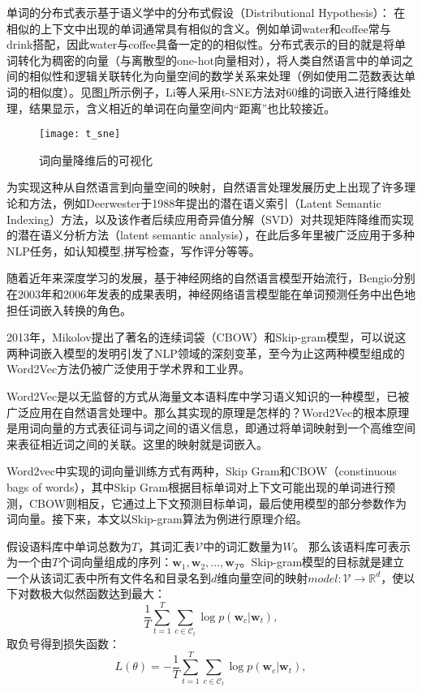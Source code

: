 单词的分布式表示基于语义学中的分布式假设（Distributional Hypothesis）\cite{distributional_hypothesis}：
在相似的上下文中出现的单词通常具有相似的含义。例如单词water和coffee常与drink搭配，因此water与coffee具备一定的的相似性。分布式表示的目的就是将单词转化为稠密的向量（与离散型的one-hot向量相对），将人类自然语言中的单词之间的相似性和逻辑关联转化为向量空间的数学关系来处理（例如使用二范数表达单词的相似度）。见图\ref{fig:t_sne}所示例子，Li等人\cite{visualizing}采用t-SNE方法对60维的词嵌入进行降维处理，结果显示，含义相近的单词在向量空间内“距离”也比较接近。
\begin{figure}[htp]
\centering
\texttt{[image: t\_sne]}
\caption{词向量降维后的可视化}
\label{fig:t_sne}
\end{figure}


为实现这种从自然语言到向量空间的映射，自然语言处理发展历史上出现了许多理论和方法，例如Deerwester于1988年提出的潜在语义索引（Latent Semantic Indexing）方法\cite{LSI}，以及该作者后续应用奇异值分解（SVD）对共现矩阵降维而实现的潜在语义分析方法（latent semantic analysis）\cite{LSA}，在此后多年里被广泛应用于多种NLP任务，如认知模型\cite{cognitive_model},拼写检查\cite{spell_checking}，写作评分\cite{essay_grading}等等。

随着近年来深度学习的发展，基于神经网络的自然语言模型开始流行，Bengio分别在2003年\cite{bengio2003}和2006年\cite{bengio2006}发表的成果表明，神经网络语言模型能在单词预测任务中出色地担任词嵌入转换的角色。

2013年，Mikolov提出了著名的连续词袋（CBOW）和Skip-gram模型\cite{skipgram}，可以说这两种词嵌入模型的发明引发了NLP领域的深刻变革，至今为止这两种模型组成的Word2Vec方法仍被广泛使用于学术界和工业界。

Word2Vec是以无监督的方式从海量文本语料库中学习语义知识的一种模型，已被广泛应用在自然语言处理中。那么其实现的原理是怎样的？Word2Vec的根本原理是用词向量的方式表征词与词之间的语义信息，即通过将单词映射到一个高维空间来表征相近词之间的关联。这里的映射就是词嵌入。

Word2vec中实现的词向量训练方式有两种，Skip Gram和CBOW（constinuous bags of words），其中Skip Gram根据目标单词对上下文可能出现的单词进行预测，CBOW则相反，它通过上下文预测目标单词，最后使用模型的部分参数作为词向量。接下来，本文以Skip-gram算法为例进行原理介绍。

假设语料库中单词总数为$T$，其词汇表$\mathcal{V}$中的词汇数量为$W$。
那么该语料库可表示为一个由$T$个词向量组成的序列：$\mathbf{w}_1, \mathbf{w}_2, \dots, \mathbf{w}_T$。Skip-gram模型的目标就是建立一个从该词汇表中所有文件名和目录名到$d$维向量空间的映射$model:\mathcal{V} \rightarrow \mathbb{R}^d$，使以下对数极大似然函数达到最大：
\begin{equation}
    \label{eq:origin_object}
    \frac{1}{T}\sum_{t=1}^T \sum_{c \in \mathcal{C}_t} \log p(\mathbf{w}_c | \mathbf{w}_t),
\end{equation}
取负号得到损失函数：
\begin{equation}
    L(\theta)= -\frac{1}{T}\sum_{t=1}^T \sum_{c \in \mathcal{C}_t} \log p(\mathbf{w}_c | \mathbf{w}_t),
\end{equation}

